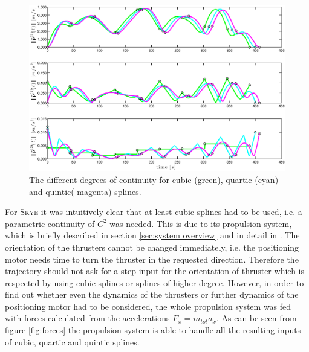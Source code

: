 \begin{figure}[H]
	\centering
    \includegraphics[width = \textwidth]{graphics/continuity.eps}
  \caption{The different degrees of continuity for cubic (green), quartic (cyan) and quintic( magenta) splines.}
  \label{fig:continuity}
\end{figure}



 For \textsc{Skye} it was intuitively clear that at least cubic splines had to be used, i.e. a parametric continuity of $C^2$ was needed. This is due to its propulsion system, which is briefly described in section \ref{sec:system overview} and in detail in \cite{schaffnervu}. The orientation of the thrusters cannot be changed immediately, i.e. the positioning motor needs time to turn the thruster in the requested direction. Therefore the trajectory should not ask for a step input for the orientation of thruster which is respected by using cubic splines or splines of higher degree. However, in order to find out whether even the dynamics of the thrusters or further dynamics of the positioning motor had to be considered, the whole propulsion system was fed with forces calculated from the accelerations $F_x=m_{tot}a_x$. As can be seen from figure \ref{fig:forces} the propulsion system is able to handle all the resulting inputs of cubic, quartic and quintic splines.
 
